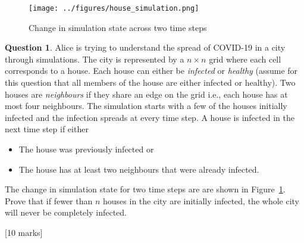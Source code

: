 \documentclass[a4paper]{article}
\theoremstyle{definition}
\newtheorem{question}{Question}
\newcommand{\qmarks}[1]{{\hspace*{\fill} [#1 marks]}}
\begin{document}
\begin{figure}[b]
    \centering
    \texttt{[image: ../figures/house\_simulation.png]}
    \caption{Change in simulation state across two time steps}\label{fig:house_simulation}
\end{figure}
\begin{question}
    Alice is trying to understand the spread of COVID-{19} in a city through simulations.
    The city is represented by a $n \times n$ grid where each cell corresponds to a house.
    Each house can either be \textit{infected} or \textit{healthy} (assume for this question that all members of the house are either infected or healthy).
    Two houses are \textit{neighbours} if they share an edge on the grid i.e., each house has at most four neighbours.
    The simulation starts with a few of the houses initially infected and the infection spreads at every time step.
    A house is infected in the next time step if either
    \begin{itemize}
	\item The house was previously infected or
	\item The house has at least two neighbours that were already infected.
    \end{itemize}

    The change in simulation state for two time steps are are shown in Figure~\ref{fig:house_simulation}.
    Prove that if fewer than $n$ houses in the city are initially infected, the whole city will never be completely infected.

    \qmarks{10}
\end{question}
\end{document}
